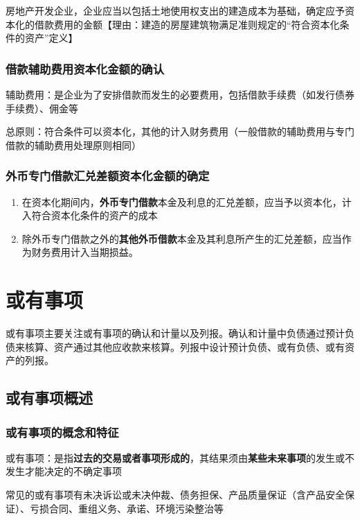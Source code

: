 \documentclass[UTF8,12pt]{ctexart}
\numberwithin{equation}{section} %
\numberwithin{figure}{section}
\numberwithin{table}{section}
\begin{document}
	房地产开发企业，企业应当以包括土地使用权支出的建造成本为基础，确定应予资本化的借款费用的金额【理由：建造的房屋建筑物满足准则规定的“符合资本化条件的资产”定义】
	
	\subsubsection{借款辅助费用资本化金额的确认}
	
	辅助费用：是企业为了安排借款而发生的必要费用，包括借款手续费（如发行债券手续费）、佣金等
	
	总原则：符合条件可以资本化，其他的计入财务费用（一般借款的辅助费用与专门借款的辅助费用处理原则相同）
	
	\subsubsection{外币专门借款汇兑差额资本化金额的确定}
	
	\begin{enumerate}
		\item 在资本化期间内，\textbf{外币专门借款}本金及利息的汇兑差额，应当予以资本化，计入符合资本化条件的资产的成本
		
		\item 除外币专门借款之外的\textbf{其他外币借款}本金及其利息所产生的汇兑差额，应当作为财务费用计入当期损益。
	\end{enumerate}
	
	\newpage
	\section{或有事项}
	或有事项主要关注或有事项的确认和计量以及列报。确认和计量中负债通过预计负债来核算、资产通过其他应收款来核算。列报中设计预计负债、或有负债、或有资产的列报。
	
	
	\subsection{或有事项概述}
	\subsubsection{或有事项的概念和特征}
	或有事项：是指\textbf{过去的交易或者事项形成的}，其结果须由\textbf{某些未来事项}的发生或不发生才能决定的不确定事项
	
	常见的或有事项有未决诉讼或未决仲裁、债务担保、产品质量保证（含产品安全保证）、亏损合同、重组义务、承诺、环境污染整治等
	
\end{document}
